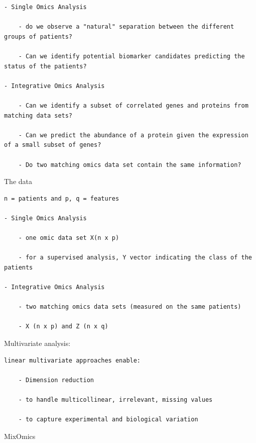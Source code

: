\documentclass[
]{book}
\begin{document}
\begin{verbatim}
- Single Omics Analysis

    - do we observe a "natural" separation between the different groups of patients?

    - Can we identify potential biomarker candidates predicting the status of the patients?

- Integrative Omics Analysis

    - Can we identify a subset of correlated genes and proteins from matching data sets?

    - Can we predict the abundance of a protein given the expression of a small subset of genes?

    - Do two matching omics data set contain the same information?
\end{verbatim}

The data

\begin{verbatim}
n = patients and p, q = features

- Single Omics Analysis

    - one omic data set X(n x p)

    - for a supervised analysis, Y vector indicating the class of the patients

- Integrative Omics Analysis

    - two matching omics data sets (measured on the same patients)

    - X (n x p) and Z (n x q)
\end{verbatim}

Multivariate analysis:

\begin{verbatim}
linear multivariate approaches enable:

    - Dimension reduction

    - to handle multicollinear, irrelevant, missing values

    - to capture experimental and biological variation
\end{verbatim}

MixOmics
\end{document}
